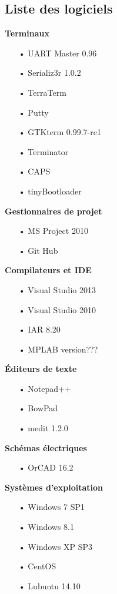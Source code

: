 \documentclass[10pt,a4paper,final]{article}
\begin{document}
\begin{spacing}{1.5}
\subsection{Liste des logiciels}
\begin{flushleft}
\HRule
\end{flushleft}
\begin{flushleft}

\begin{multicols}{3}

\textbf{Terminaux}
\begin{itemize}
\item[•]UART Master 0.96
\item[•]Serializ3r 1.0.2
\item[•]TerraTerm
\item[•]Putty
\item[•]GTKterm 0.99.7-rc1
\item[•]Terminator
\item[•]CAPS
\item[•]tinyBootloader
\end{itemize}

\textbf{Gestionnaires de projet}
\begin{itemize}
\item[•]MS Project 2010
\item[•]Git Hub
\end{itemize}

\textbf{Compilateurs et IDE}
\begin{itemize}
\item[•]Visual Studio 2013
\item[•]Visual Studio 2010
\item[•]IAR 8.20
\item[•]MPLAB version???
\end{itemize}

\textbf{Éditeurs de texte}
\begin{itemize}
\item[•]Notepad++
\item[•]BowPad
\item[•]medit 1.2.0
\end{itemize}
\textbf{Schémas électriques}

\begin{itemize}
\item[•]OrCAD 16.2
\end{itemize}

\bigskip

\textbf{Systèmes d'exploitation}
\begin{itemize}
\item[•]Windows 7 SP1
\item[•]Windows 8.1
\item[•]Windows XP SP3
\item[•]CentOS
\item[•]Lubuntu 14.10
\end{itemize}


\end{multicols}
\end{flushleft}
\end{spacing}
\end{document}
